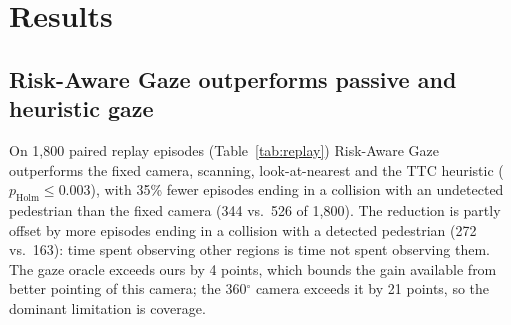 \documentclass[letterpaper, 10 pt, conference]{ieeeconf}
\begin{document}
\section{Results}

\subsection{Risk-Aware Gaze outperforms passive and heuristic gaze}
On 1,800 paired replay episodes (Table~\ref{tab:replay}) Risk-Aware Gaze outperforms the fixed camera, scanning, look-at-nearest and the TTC heuristic ($p_\text{Holm} \le 0.003$), with 35\% fewer episodes ending in a collision with an undetected pedestrian than the fixed camera (344 vs.\ 526 of 1,800). The reduction is partly offset by more episodes ending in a collision with a detected pedestrian (272 vs.\ 163): time spent observing other regions is time not spent observing them. The gaze oracle exceeds ours by 4 points, which bounds the gain available from better pointing of this camera; the 360$^\circ$ camera exceeds it by 21 points, so the dominant limitation is coverage.

\begin{table}[t]
\centering
\caption{Replayed crowds, 1,800 paired episodes. Each episode ends as a success, a collision with an undetected pedestrian, a collision with a detected pedestrian, or a timeout (fractions; spawn collisions excluded). $p_\text{Holm}$ vs.\ ours.}
\label{tab:replay}
\footnotesize
\setlength{\tabcolsep}{3.5pt}
\end{table}
\end{document}
